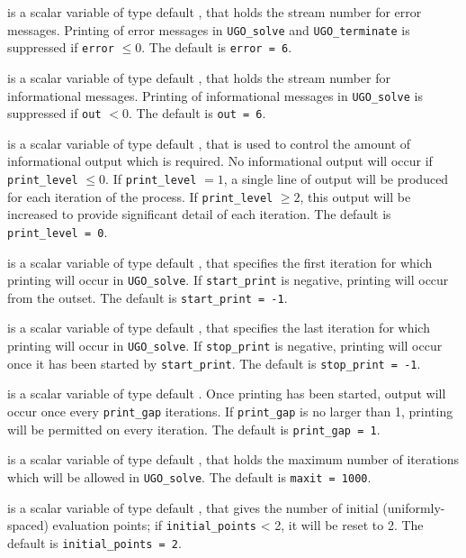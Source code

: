 \documentclass{galahad}
\newcommand{\packagename}{UGO}
\begin{document}
\begin{description}

 is a scalar variable of type default \integer, that holds the
stream number for error messages. Printing of error messages in
{\tt \packagename\_solve} and {\tt \packagename\_terminate}
is suppressed if {\tt error} $\leq 0$.
The default is {\tt error = 6}.

 is a scalar variable of type default \integer, that holds the
stream number for informational messages. Printing of informational messages in
{\tt \packagename\_solve} is suppressed if {\tt out} $< 0$.
The default is {\tt out = 6}.

 is a scalar variable of type default \integer, that is used
to control the amount of informational output which is required. No
informational output will occur if {\tt print\_level} $\leq 0$. If
{\tt print\_level} $= 1$, a single line of output will be produced for each
iteration of the process. If {\tt print\_level} $\geq 2$, this output will be
increased to provide significant detail of each iteration.
The default is {\tt print\_level = 0}.

 is a scalar variable of type default \integer, that specifies
the first iteration for which printing will occur in {\tt \packagename\_solve}.
If {\tt start\_print} is negative, printing will occur from the outset.
The default is {\tt start\_print = -1}.

 is a scalar variable of type default \integer, that specifies
the last iteration for which printing will occur in  {\tt \packagename\_solve}.
If {\tt stop\_print} is negative, printing will occur once it has been
started by {\tt start\_print}.
The default is {\tt stop\_print = -1}.

 is a scalar variable of type default \integer.
Once printing has been started, output will occur once every
{\tt print\_gap} iterations. If {\tt print\_gap} is no larger than 1,
printing will be permitted on every iteration.
The default is {\tt print\_gap = 1}.

 is a scalar variable of type default \integer, that holds the
maximum number of iterations which will be allowed in {\tt \packagename\_solve}.
The default is {\tt maxit = 1000}.

 is a scalar variable of type default \integer, that
gives the number of initial (uniformly-spaced) evaluation points; if
{\tt initial\_points} < 2, it will be reset to 2.
The default is {\tt initial\_points = 2}.


\end{description}
\end{document}
